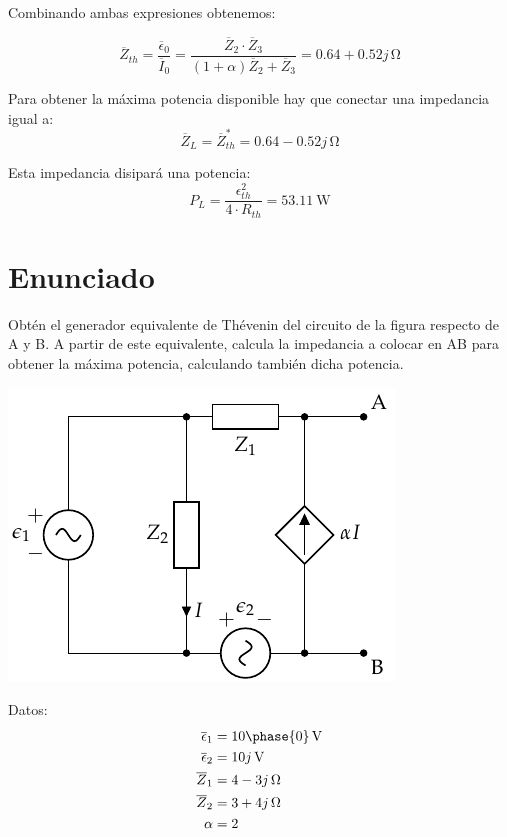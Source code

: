 Combinando ambas expresiones obtenemos:

\begin{equation*}
  \overline{Z}_{th} = \frac{\overline{\epsilon}_0}{\overline{I}_0} = \frac{\overline{Z}_2 \cdot \overline{Z}_3}{(1 + \alpha) \overline{Z}_2 + \overline{Z}_3} = 0.64 + 0.52j\,\si{\ohm}
\end{equation*}

Para obtener la máxima potencia disponible hay que conectar una impedancia igual a:
\begin{equation*}
\overline{Z}_L = \overline{Z}^*_{th} = 0.64-0.52j\,\si{\ohm}
\end{equation*}

Esta impedancia disipará una potencia:
\begin{equation*}
P_L = \frac{\epsilon_{th}^2}{4 \cdot R_{th}} = \qty{53.11}{\watt}
\end{equation*}


\section{Enunciado}

Obtén el generador equivalente de Thévenin del circuito de la figura respecto de A y B. A partir de este equivalente, calcula la impedancia a colocar en AB para obtener la máxima potencia, calculando también dicha potencia.

\begin{minipage}{0.5\textwidth}
\begin{center}
\includegraphics{figuras/Thevenin5}
\end{center}
\end{minipage}
\begin{minipage}{0.5\textwidth}

\hspace{20mm}Datos:
  \begin{align*}
    \overline{\epsilon}_1 &= \SI[parse-numbers=false]{10\phase{0}}{\volt}\\
    \overline{\epsilon}_2 &= \SI[parse-numbers=false]{10j}{\volt}\\
    \overline{Z}_1 &= \SI[parse-numbers=false]{4 - 3j}{\ohm}\\
    \overline{Z}_2 &= \SI[parse-numbers=false]{3 + 4j}{\ohm}\\
    \alpha &= 2
  \end{align*}
\end{minipage}
